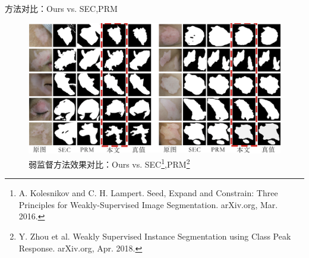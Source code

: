\begin{frame}{方法对比：Ours vs. SEC,PRM}
\begin{figure}
    \centering
    \includegraphics[width=.95\linewidth]{figures/weaklySupervisedCompare.png}
    \vspace{-.5em}
    \caption{弱监督方法效果对比：Ours vs. SEC\footnote[frame]{\tiny A. Kolesnikov and C. H. Lampert. Seed, Expand and Constrain:
Three Principles for Weakly-Supervised Image Segmentation. arXiv.org, Mar. 2016.},PRM\footnote[frame]{\tiny Y. Zhou et al. Weakly Supervised Instance Segmentation using Class Peak Response. arXiv.org, Apr. 2018.}}
\end{figure}
\end{frame}
